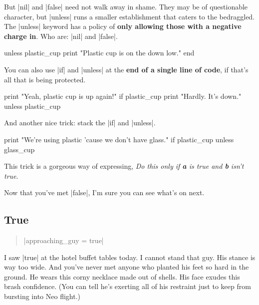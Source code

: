 \documentclass[12pt,twoside]{report}
\begin{document}
But \rubyinline|nil| and
\rubyinline|false| need not walk away in shame.  They
may be of questionable character, but
\rubyinline|unless| runs a smaller establishment that
caters to the bedraggled. The \rubyinline|unless|
keyword has a policy of {\bf only allowing those with a negative
  charge in}. Who are: \rubyinline|nil| and
\rubyinline|false|.


\begin{rubycode}

 unless plastic_cup 
   print "Plastic cup is on the down low."  
 end

\end{rubycode}


You can also use \rubyinline|if| and
\rubyinline|unless| at the {\bf end of a single line
  of code}, if that's all that is being protected.


\begin{rubycode}

 print "Yeah, plastic cup is up again!"  if plastic_cup 
 print "Hardly. It's down." unless plastic_cup

\end{rubycode}


And another nice trick: stack the \rubyinline|if| and
\rubyinline|unless|.


\begin{rubycode}

 print "We're using plastic 'cause we don't have glass." if plastic_cup unless glass_cup

\end{rubycode}

This trick is a gorgeous way of expressing, {\em Do this only if {\bf
    a} is true and {\bf b} isn't true}.

Now that you've met \rubyinline|false|, I'm sure you
can see what's on next.


\subsection{True}



\begin{quote}
\rubyinline|approaching_guy = true|\end{quote}


I saw \rubyinline|true| at the hotel buffet tables
today.  I cannot stand that guy. His stance is way too wide.  And
you've never met anyone who planted his feet so hard in the ground.
He wears this corny necklace made out of shells.  His face exudes this
brash confidence.  (You can tell he's exerting all of his restraint
just to keep from bursting into Neo flight.)
\end{document}
